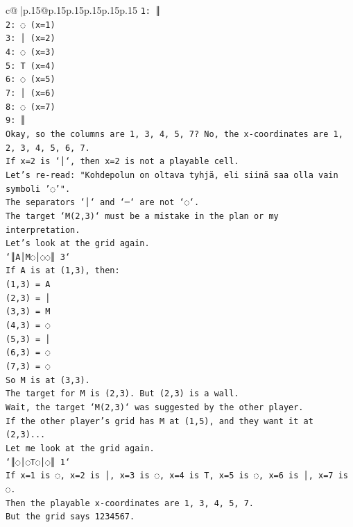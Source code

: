 \documentclass{article}
\begin{document}
{\begin{supertabular}{c@{$\;$}|p{.15\linewidth}@{}p{.15\linewidth}p{.15\linewidth}p{.15\linewidth}p{.15\linewidth}p{.15\linewidth}}
{{{\texttt{1: ║} \\
\texttt{2: ◌ (x=1)} \\
\texttt{3: │ (x=2)} \\
\texttt{4: ◌ (x=3)} \\
\texttt{5: T (x=4)} \\
\texttt{6: ◌ (x=5)} \\
\texttt{7: │ (x=6)} \\
\texttt{8: ◌ (x=7)} \\
\texttt{9: ║} \\
\texttt{Okay, so the columns are 1, 3, 4, 5, 7? No, the x{-}coordinates are 1, 2, 3, 4, 5, 6, 7.} \\
\texttt{If x=2 is `│`, then x=2 is not a playable cell.} \\
\texttt{Let's re{-}read: "Kohdepolun on oltava tyhjä, eli siinä saa olla vain symboli '◌'".} \\
\texttt{The separators `│` and `─` are not `◌`.} \\
\texttt{The target `M(2,3)` must be a mistake in the plan or my interpretation.} \\
\texttt{Let's look at the grid again.} \\
\texttt{`║A│M◌│◌◌║ 3`} \\
\texttt{If A is at (1,3), then:} \\
\texttt{(1,3) = A} \\
\texttt{(2,3) = │} \\
\texttt{(3,3) = M} \\
\texttt{(4,3) = ◌} \\
\texttt{(5,3) = │} \\
\texttt{(6,3) = ◌} \\
\texttt{(7,3) = ◌} \\
\texttt{So M is at (3,3).} \\
\texttt{The target for M is (2,3). But (2,3) is a wall.} \\
\texttt{Wait, the target `M(2,3)` was suggested by the other player.} \\
\texttt{If the other player's grid has M at (1,5), and they want it at (2,3)...} \\
\texttt{Let me look at the grid again.} \\
\texttt{`║◌│◌T◌│◌║ 1`} \\
\texttt{If x=1 is ◌, x=2 is │, x=3 is ◌, x=4 is T, x=5 is ◌, x=6 is │, x=7 is ◌.} \\
\texttt{Then the playable x{-}coordinates are 1, 3, 4, 5, 7.} \\
\texttt{But the grid says 1234567.} \\
}}}
\end{supertabular}}
\end{document}
